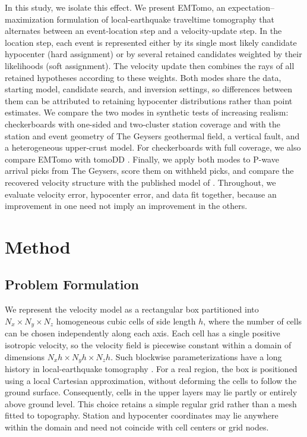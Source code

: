 \documentclass[12pt, a4paper]{article}
\begin{document}
In this study, we isolate this effect. We present EMTomo, an expectation--maximization formulation \parencite{dempster1977} of local-earthquake traveltime tomography that alternates between an event-location step and a velocity-update step. In the location step, each event is represented either by its single most likely candidate hypocenter (hard assignment) or by several retained candidates weighted by their likelihoods (soft assignment). The velocity update then combines the rays of all retained hypotheses according to these weights. Both modes share the data, starting model, candidate search, and inversion settings, so differences between them can be attributed to retaining hypocenter distributions rather than point estimates. We compare the two modes in synthetic tests of increasing realism: checkerboards with one-sided and two-cluster station coverage and with the station and event geometry of The Geysers geothermal field, a vertical fault, and a heterogeneous upper-crust model. For checkerboards with full coverage, we also compare EMTomo with tomoDD \parencite{zhang2003}. Finally, we apply both modes to P-wave arrival picks from The Geysers, score them on withheld picks, and compare the recovered velocity structure with the published model of \textcite{guo2021geysers}. Throughout, we evaluate velocity error, hypocenter error, and data fit together, because an improvement in one need not imply an improvement in the others.


\section{Method}
\label{sec:method}

\subsection{Problem Formulation}
\label{subsec:parameterization}

We represent the velocity model as a rectangular box partitioned into $N_x \times N_y \times N_z$ homogeneous cubic cells of side length $h$, where the number of cells can be chosen independently along each axis. Each cell has a single positive isotropic velocity, so the velocity field is piecewise constant within a domain of dimensions $N_x h \times N_y h \times N_z h$. Such blockwise parameterizations have a long history in local-earthquake tomography \parencite{aki1976}. For a real region, the box is positioned using a local Cartesian approximation, without deforming the cells to follow the ground surface. Consequently, cells in the upper layers may lie partly or entirely above ground level. This choice retains a simple regular grid rather than a mesh fitted to topography. Station and hypocenter coordinates may lie anywhere within the domain and need not coincide with cell centers or grid nodes.
\end{document}
